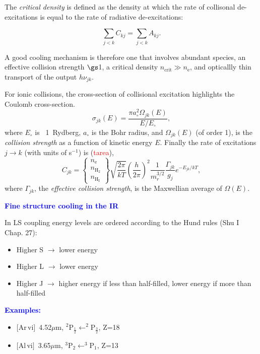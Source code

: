 \foilhead{}

The {\em critical density} is defined as the density at which the rate
of collisonal de-excitations is equal to the rate of radiative
de-excitations:

\[\sum_{j<k} C_{kj} = \sum_{j<k} A_{kj} .\]

A good cooling mechanism is therefore one that involves abundant
species, an effective collision strength $\gs$1, a critical density
$n_\mathrm{crit} \gg n_\mathrm{e}$, and opticallly thin transport of
the output $h \nu_{jk}$.


For ionic collisions, the cross-section of collisional excitation
highlights the Coulomb cross-section.
\[ \sigma_{jk}(E)=\frac{\pi a_{\circ}^{2}  \Omega_{jk}(E)}{E/E_{\circ}}, \]
where $E_{\circ}$ is ~1~Rydberg, $a_{\circ}$ is the Bohr radius, and
$\Omega_{jk}(E)$ (of order 1), is the {\em collision strength} as a
function of  kinetic energy $E$. Finally the rate of excitations $j
\rightarrow k$ (with units of s$^{-1}$) is (\textcolor{red}{tarea}),
\[
C_{jk}= \left\{ \begin{array}{c} n_\mathrm{e} \\ n_\mathrm{H_2} \\
n_\mathrm{H_I} \end{array} \right\} {\sqrt{\frac{2\pi}{kT}}}
{\left(\frac{h}{2\pi}\right)}^{2}
\frac{1}{m_r^{3/2}} \frac{\Gamma_{jk}}{g_{j}} e^{-E_{jk}/kT},
\] where  $\Gamma_{jk}$,  the   {\em  effective collision strength},
is the Maxwellian average of $\Omega(E)$.


\foilhead{}
\textcolor{blue}{\bf Fine structure cooling in the IR}

In LS coupling energy levels are ordered according to the Hund rules
(Shu I Chap. 27):

\begin{itemize}
\item Higher S $\rightarrow$ lower energy
\item Higher L $\rightarrow$ lower energy
\item Higher J $\rightarrow$ higher energy if less than half-filled,
lower energy if more than half-filled
\end{itemize}

\textcolor{blue}{\bf Examples:} 
\begin{itemize}
\item  $[$Ar\,{\sc vi}$]$~4.52$\mu$m, $^2$P$_\frac{1}{2}\leftarrow ^2$P$_\frac{3}{2}$, Z=18
\item  $[$Al\,{\sc vi}$]$~3.65$\mu$m, $^3$P$_2\leftarrow ^3$P$_1$, Z=13
\end{itemize}


